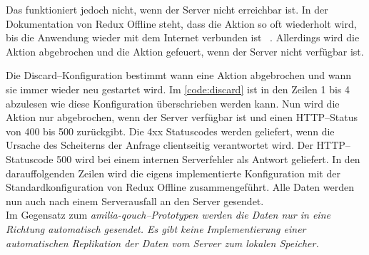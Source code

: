 Das funktioniert jedoch nicht, wenn der Server nicht erreichbar ist.
In der Dokumentation von Redux Offline steht, dass die Aktion so oft wiederholt wird, bis die Anwendung wieder mit dem Internet verbunden ist ~\cite{giving-up}.
Allerdings wird die Aktion abgebrochen und die  Aktion gefeuert, wenn der Server nicht verfügbar ist.
\begin{center}
  
\end{center}
%
Die Discard--Konfiguration bestimmt wann eine Aktion abgebrochen und wann sie immer wieder neu gestartet wird.
Im \autoref{code:discard} ist in den Zeilen 1 bis 4 abzulesen wie diese Konfiguration überschrieben werden kann.
Nun wird die Aktion nur abgebrochen, wenn der Server verfügbar ist und einen \gls{HTTP}--Status von 400 bis 500 zurückgibt.
Die 4xx Statuscodes werden geliefert, wenn die Ursache des Scheiterns der Anfrage clientseitig verantwortet wird. Der \gls{HTTP}--Statuscode 500 wird bei einem internen Serverfehler als Antwort geliefert. 
In den darauffolgenden Zeilen wird die eigens implementierte Konfiguration mit der Standardkonfiguration von Redux Offline zusammengeführt.
Alle Daten werden nun auch nach einem Serverausfall an den Server gesendet.\\
Im Gegensatz zum \it{amilia-qouch}--Prototypen werden die Daten nur in eine Richtung automatisch gesendet.
Es gibt keine Implementierung einer automatischen Replikation der Daten vom Server zum lokalen Speicher.